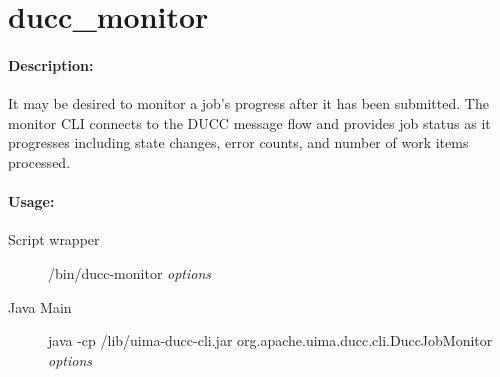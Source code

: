 % 
% 
% 
% 

\ifpdf
\else
{}
\fi
    \section{ducc\_monitor}

    \paragraph{Description:}
    
    It may be desired to monitor a job's progress after it has been submitted. The monitor CLI 
    connects to the DUCC message flow and provides job status as it progresses including state 
    changes, error counts, and number of work items processed. 
    
    \paragraph{Usage:}
    \begin{description}
    \item[Script wrapper] \ducchome/bin/ducc-monitor {\em options}
    \item[Java Main]      java -cp \ducchome/lib/uima-ducc-cli.jar org.apache.uima.ducc.cli.DuccJobMonitor {\em options}
    \end{description}

